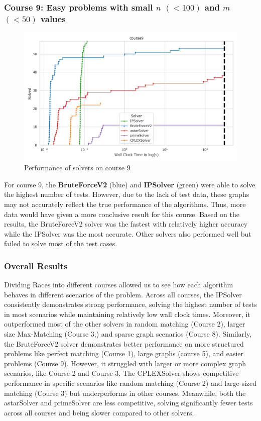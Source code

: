 \subsubsection*{Course 9: Easy problems with small $n$ $(<100)$ and $m$ $(<50)$ values}

\begin{figure}[h!]
    \centering
    \includegraphics[width=\textwidth]{Graphs/course9.png}
    \caption{Performance of solvers on course 9}
\end{figure}

For course 9, the \textbf{BruteForceV2} (blue) and \textbf{IPSolver} (green) were able to solve the highest number of tests. However, due to the lack of test data, these graphs may not accurately reflect the true performance of the algorithms. Thus, more data would have given a more conclusive result for this course. Based on the results, the BruteForceV2 solver was the fastest with relatively higher accuracy while the IPSolver was the most accurate. Other solvers also performed well but failed to solve most of the test cases.


\subsubsection*{Overall Results}

Dividing Races into different courses allowed us to see how each algorithm behaves in different scenarios of the problem. Across all courses, the IPSolver consistently demonstrates strong performance, solving the highest number of tests in most scenarios while maintaining relatively low wall clock times. Moreover, it outperformed most of the other solvers in random matching (Course 2), larger size Max-Matching (Course 3,) and sparse graph scenarios (Course 8). Similarly, the BruteForceV2 solver demonstrates better performance on more structured problems like perfect matching (Course 1), large graphs (course 5), and easier problems (Course 9). However, it struggled with larger or more complex graph scenarios, like Course 2 and Course 3. The CPLEXSolver shows competitive performance in specific scenarios like random matching (Course 2) and large-sized matching (Course 3) but underperforms in other courses. Meanwhile, both the astarSolver and primeSolver are less competitive, solving significantly fewer tests across all courses and being slower compared to other solvers.


